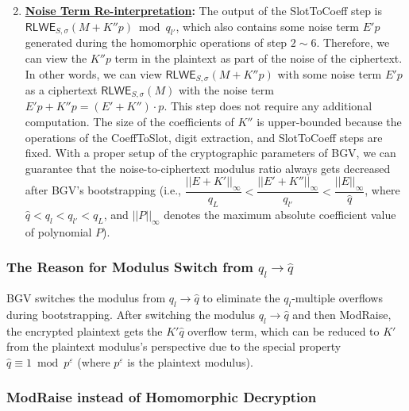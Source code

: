 \begin{enumerate}
$ $

\item \textbf{\textsf{\underline{Noise Term Re-interpretation}}:} The output of the \textsf{SlotToCoeff} step is $\textsf{RLWE}_{S, \sigma}(M + K''p) \bmod q_{l'}$, which also contains some noise term $E'p$ generated during the homomorphic operations of step $2 \sim 6$. Therefore, we can view the $K''p$ term in the plaintext as part of the noise of the ciphertext. In other words, we can view $\textsf{RLWE}_{S, \sigma}(M + K''p)$ with some noise term $E'p$ as a ciphertext $\textsf{RLWE}_{S, \sigma}(M)$ with the noise term $E'p + K''p = (E' + K'')\cdot p$. This step does not require any additional computation. The size of the coefficients of $K''$ is upper-bounded because the operations of the \textsf{CoeffToSlot}, digit extraction, and \textsf{SlotToCoeff} steps are fixed. With a proper setup of the cryptographic parameters of BGV, we can guarantee that the noise-to-ciphertext modulus ratio always gets decreased after BGV's bootstrapping (i.e., $\dfrac{||E + K'||_{\infty}}{q_L} < \dfrac{||E' + K''||_{\infty}}{q_{l'}} < \dfrac{||E||_{\infty}}{\hat{q}}$, where $\hat{q} < q_l < q_{l'} < q_L$, and $||P||_\infty$ denotes the maximum absolute coefficient value of polynomial $P$).

\end{enumerate}



\subsubsection{The Reason for Modulus Switch from $q_l \rightarrow \hat{q}$} 

BGV switches the modulus from $q_l \rightarrow \hat{q}$ to eliminate the $q_l$-multiple overflows during bootstrapping. After switching the modulus $q_l \rightarrow \hat{q}$ and then \textsf{ModRaise}, the encrypted plaintext gets the $K'\hat{q}$ overflow term, which can be reduced to $K'$ from the plaintext modulus's perspective due to the special property $\hat{q} \equiv 1 \bmod p^\varepsilon$ (where $p^\varepsilon$ is the plaintext modulus).


\subsubsection{\textsf{ModRaise} instead of Homomorphic Decryption} 

